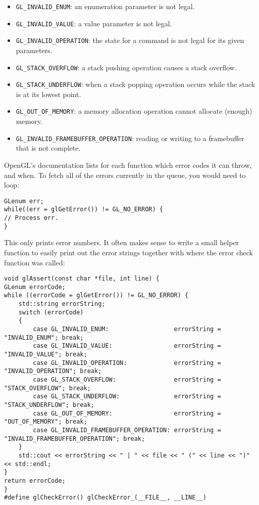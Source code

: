 \documentclass[8pt, table, xcdraw]{article}%
\begin{document}
\begin{itemize}
\item \lstinline{GL_INVALID_ENUM}: an enumeration parameter is not legal.
\item \lstinline{GL_INVALID_VALUE}: a value parameter is not legal.
\item \lstinline{GL_INVALID_OPERATION}: the state for a command is not legal for its given parameters.
\item \lstinline{GL_STACK_OVERFLOW}: a stack pushing operation causes a stack overflow.
\item \lstinline{GL_STACK_UNDERFLOW}: when a stack popping operation occurs while the stack is at its lowest point.
\item \lstinline{GL_OUT_OF_MEMORY}: a memory allocation operation cannot allocate (enough) memory.
\item \lstinline{GL_INVALID_FRAMEBUFFER_OPERATION}: reading or writing to a framebuffer that is not complete.
\end{itemize}

OpenGL's documentation lists for each function which error codes it can throw, and when. To fetch all of the errors currently in the queue, you would need to loop:

\begin{lstlisting}
GLenum err;
while((err = glGetError()) != GL_NO_ERROR) {
// Process err.
}
\end{lstlisting}

This only prints error numbers. It often makes sense to write a small helper function to easily print out the error strings together with where the error check function was called: 

\begin{lstlisting}
void glAssert(const char *file, int line) {
GLenum errorCode;
while ((errorCode = glGetError()) != GL_NO_ERROR) {
    std::string errorString;
    switch (errorCode)
    {
        case GL_INVALID_ENUM:                  errorString = "INVALID_ENUM"; break;
        case GL_INVALID_VALUE:                 errorString = "INVALID_VALUE"; break;
        case GL_INVALID_OPERATION:             errorString = "INVALID_OPERATION"; break;
        case GL_STACK_OVERFLOW:                errorString = "STACK_OVERFLOW"; break;
        case GL_STACK_UNDERFLOW:               errorString = "STACK_UNDERFLOW"; break;
        case GL_OUT_OF_MEMORY:                 errorString = "OUT_OF_MEMORY"; break;
        case GL_INVALID_FRAMEBUFFER_OPERATION: errorString = "INVALID_FRAMEBUFFER_OPERATION"; break;
    }
    std::cout << errorString << " | " << file << " (" << line << ")" << std::endl;
}
return errorCode;
}
#define glCheckError() glCheckError_(__FILE__, __LINE__) 
\end{lstlisting}
\end{document}
